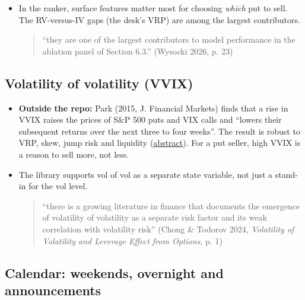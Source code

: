 \documentclass{article}
\begin{document}
\begin{itemize}
\begin{itemize}
\end{itemize}

\item In the ranker, surface features matter most for choosing \emph{which} put to sell. The RV-versus-IV gaps (the desk's VRP) are among the largest contributors.

\begin{quote}``they are one of the largest contributors to model performance in the ablation panel of Section 6.3.'' (Wysocki 2026, p. 23)\end{quote}

\end{itemize}

\subsection{Volatility of volatility (VVIX)}

\begin{itemize}

\item \textbf{Outside the repo:} Park (2015, J. Financial Markets) finds that a rise in VVIX raises the prices of S\&P 500 puts and VIX calls and ``lowers their subsequent returns over the next three to four weeks''. The result is robust to VRP, skew, jump risk and liquidity (\href{https://econpapers.repec.org/RePEc:eee:finmar:v:26:y:2015:i:c:p:38-63}{abstract}). For a put seller, high VVIX is a reason to sell more, not less.

\item The library supports vol of vol as a separate state variable, not just a stand-in for the vol level.

\begin{quote}``there is a growing literature in finance that documents the emergence of volatility of volatility as a separate risk factor and its weak correlation with volatility risk'' (Chong \& Todorov 2024, \emph{Volatility of Volatility and Leverage Effect from Options}, p. 1)\end{quote}

\end{itemize}

\subsection{Calendar: weekends, overnight and announcements}
\end{document}
